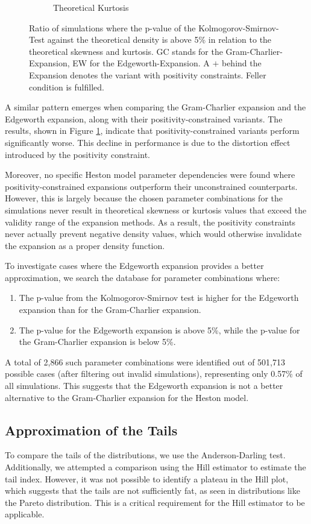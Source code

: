 \begin{figure}
\begin{subfigure}[b]{0.49\textwidth}
        \caption{Theoretical Kurtosis}
    \end{subfigure}
    \caption{Ratio of simulations where the p-value of the Kolmogorov-Smirnov-Test against the theoretical density is above 5\% in relation to the theoretical skewness and kurtosis. GC stands for the Gram-Charlier-Expansion, EW for the Edgeworth-Expansion. A $+$ behind the Expansion denotes the variant with positivity constraints. Feller condition is fulfilled.}
    \label{fig:gc_vs_ew_theoretical_skewness_kurtosis}
\end{figure}

A similar pattern emerges when comparing the Gram-Charlier expansion and the Edgeworth expansion, along with their positivity-constrained variants. The results, shown in Figure \ref{fig:gc_vs_ew_theoretical_skewness_kurtosis}, indicate that positivity-constrained variants perform significantly worse. This decline in performance is due to the distortion effect introduced by the positivity constraint.

Moreover, no specific Heston model parameter dependencies were found where positivity-constrained expansions outperform their unconstrained counterparts. However, this is largely because the chosen parameter combinations for the simulations never result in theoretical skewness or kurtosis values that exceed the validity range of the expansion methods. As a result, the positivity constraints never actually prevent negative density values, which would otherwise invalidate the expansion as a proper density function.

To investigate cases where the Edgeworth expansion provides a better approximation, we search the database for parameter combinations where:
\begin{enumerate}
    \item The p-value from the Kolmogorov-Smirnov test is higher for the Edgeworth expansion than for the Gram-Charlier expansion.
    \item The p-value for the Edgeworth expansion is above 5\%, while the p-value for the Gram-Charlier expansion is below 5\%.
\end{enumerate}
A total of 2,866 such parameter combinations were identified out of 501,713 possible cases (after filtering out invalid simulations), representing only 0.57\% of all simulations. This suggests that the Edgeworth expansion is not a better alternative to the Gram-Charlier expansion for the Heston model.

\subsection{Approximation of the Tails}
To compare the tails of the distributions, we use the Anderson-Darling test. Additionally, we attempted a comparison using the Hill estimator to estimate the tail index. However, it was not possible to identify a plateau in the Hill plot, which suggests that the tails are not sufficiently fat, as seen in distributions like the Pareto distribution. This is a critical requirement for the Hill estimator to be applicable.

